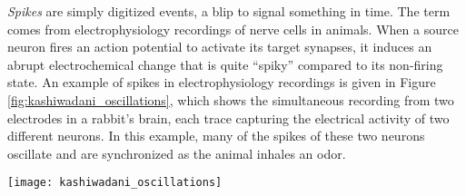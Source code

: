 \emph{Spikes} are simply digitized events, a blip to signal something in time.
The term comes from electrophysiology recordings of nerve cells in animals.
When a source neuron fires an action potential to activate its target synapses, it induces an abrupt electrochemical change that is quite ``spiky'' compared to its non-firing state.
An example of spikes in electrophysiology recordings is given in Figure \ref{fig:kashiwadani_oscillations}, which shows the simultaneous recording from two electrodes in a rabbit's brain, each trace capturing the electrical activity of two different neurons.
In this example, many of the spikes of these two neurons oscillate and are synchronized as the animal inhales an odor.

\begin{SCfigure}[0.7][h]
\texttt{[image: kashiwadani\_oscillations]}
\caption{Simultaneous extracellular electrophysiology recordings of two neurons from the rabbit olfactory bulb in response to odor stimulation. Arrows demarcate coincident spikes between these neurons. 
Image courtesy of \citet{kashiwadaniSynchronizedOscillatoryDischarges1999}.}
\label{fig:kashiwadani_oscillations}
\end{SCfigure}



